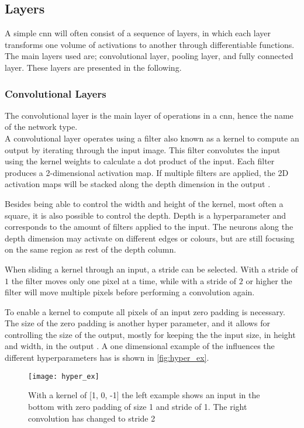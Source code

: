 \subsection{Layers}
A simple \gls{cnn} will often consist of a sequence of layers, in which each layer transforms one volume of activations to another through differentiable functions. The main layers used are; convolutional layer, pooling layer, and fully connected layer. These layers are presented in the following.

\subsubsection{Convolutional Layers}
The convolutional layer is the main layer of operations in a \gls{cnn}, hence the name of the network type.\\

A convolutional layer operates using a filter also known as a kernel to compute an output by iterating through the input image. This filter convolutes the input using the kernel weights to calculate a dot product of the input. Each filter produces a 2-dimensional activation map. If multiple filters are applied, the 2D activation maps will be stacked along the depth dimension in the output .

Besides being able to control the width and height of the kernel, most often a square, it is also possible to control the depth. Depth is a hyperparameter and corresponds to the amount of filters applied to the input. The neurons along the depth dimension may activate on different edges or colours, but are still focusing on the same region as rest of the depth column.

When sliding a kernel through an input, a stride can be selected. With a stride of $1$ the filter moves only one pixel at a time, while with a stride of $2$ or higher the filter will move multiple pixels before performing a convolution again.

To enable a kernel to compute all pixels of an input zero padding is necessary. The size of the zero padding is another hyper parameter, and it allows for controlling the size of the output, mostly for keeping the the input size, in height and width, in the output \citep{Karpathy2019}. A one dimensional example of the influences the different hyperparameters has is shown in \autoref{fig:hyper_ex}.

\begin{figure}[H]
	\centering
	\texttt{[image: hyper\_ex]}
	\caption{With a kernel of [1, 0, -1] the left example shows an input in the bottom with zero padding of size 1 and stride of 1. The right convolution has changed to stride 2 \citep{Karpathy2019}}
	\label{fig:hyper_ex}
\end{figure}

